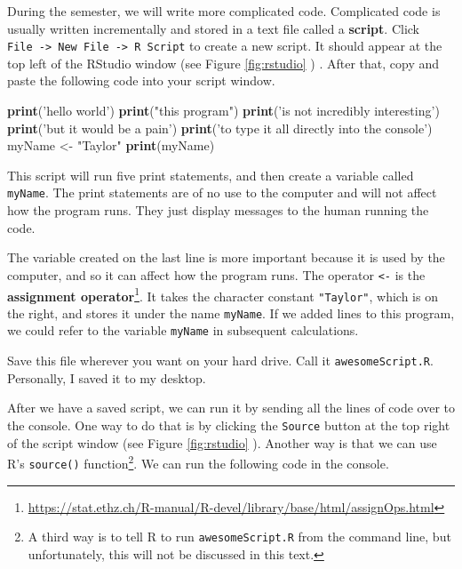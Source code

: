 \documentclass[12pt,krantz2]{krantz}
\makeatletter
\newenvironment{Shaded}{\begin{snugshade}}{\end{snugshade}}
\newcommand{\KeywordTok}[1]{\textcolor[rgb]{0.27,0.27,0.27}{\textbf{#1}}}
\newcommand{\NormalTok}[1]{#1}
\newcommand{\StringTok}[1]{\textcolor[rgb]{0.5,0.5,0.5}{#1}}
\renewcommand{\href}[2]{#2\footnote{\url{#1}}}
\newenvironment{kframe}{%
\medskip{}
\setlength{\fboxsep}{.8em}
 \def\at@end@of@kframe{}%
 \ifinner\ifhmode%
  \def\at@end@of@kframe{\end{minipage}}%
  \begin{minipage}{\columnwidth}%
 \fi\fi%
 \def\FrameCommand##1{\hskip\@totalleftmargin \hskip-\fboxsep
 \colorbox{shadecolor}{##1}\hskip-\fboxsep
     \hskip-\linewidth \hskip-\@totalleftmargin \hskip\columnwidth}%
 \MakeFramed {\advance\hsize-\width
   \@totalleftmargin\z@ \linewidth\hsize
   \@setminipage}}%
 {\par\unskip\endMakeFramed%
 \at@end@of@kframe}
\renewenvironment{Shaded}{\begin{kframe}}{\end{kframe}}
\makeatother
\begin{document}
During the semester, we will write more complicated code. Complicated code is usually written incrementally and stored in a text file called a \textbf{script}. Click \texttt{File\ -\textgreater{}\ New\ File\ -\textgreater{}\ R\ Script} to create a new script. It should appear at the top left of the RStudio window (see Figure \ref{fig:rstudio} ) . After that, copy and paste the following code into your script window.

\begin{Shaded}
\begin{Highlighting}[]
\KeywordTok{print}\NormalTok{(}\StringTok{'hello world'}\NormalTok{)}
\KeywordTok{print}\NormalTok{(}\StringTok{"this program"}\NormalTok{)}
\KeywordTok{print}\NormalTok{(}\StringTok{'is not incredibly interesting'}\NormalTok{)}
\KeywordTok{print}\NormalTok{(}\StringTok{'but it would be a pain'}\NormalTok{)}
\KeywordTok{print}\NormalTok{(}\StringTok{'to type it all directly into the console'}\NormalTok{)}
\NormalTok{myName <-}\StringTok{ "Taylor"}
\KeywordTok{print}\NormalTok{(myName)}
\end{Highlighting}
\end{Shaded}

This script will run five print statements, and then create a variable called \texttt{myName}. The print statements are of no use to the computer and will not affect how the program runs. They just display messages to the human running the code.

The variable created on the last line is more important because it is used by the computer, and so it can affect how the program runs. The operator \texttt{\textless{}-} is the \href{https://stat.ethz.ch/R-manual/R-devel/library/base/html/assignOps.html}{\textbf{assignment operator}}. It takes the character constant \texttt{"Taylor"}, which is on the right, and stores it under the name \texttt{myName}. If we added lines to this program, we could refer to the variable \texttt{myName} in subsequent calculations.

Save this file wherever you want on your hard drive. Call it \texttt{awesomeScript.R}. Personally, I saved it to my desktop.

After we have a saved script, we can run it by sending all the lines of code over to the console. One way to do that is by clicking the \texttt{Source} button at the top right of the script window (see Figure \ref{fig:rstudio} ). Another way is that we can use R's \texttt{source()} function\footnote{A third way is to tell R to run \texttt{awesomeScript.R} from the command line, but unfortunately, this will not be discussed in this text. }. We can run the following code in the console.
\end{document}
